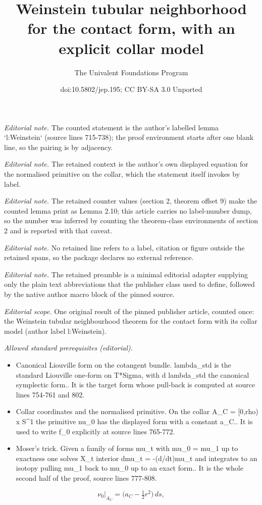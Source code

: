 \documentclass[10pt,a4paper]{article}
\title{Weinstein tubular neighborhood for the contact form, with an explicit collar model}
\author{The Univalent Foundations Program}
\date{doi:10.5802/jep.195; CC BY-SA 3.0 Unported}
\theoremstyle{definition}
\begin{document}
\maketitle
\setcounter{section}{2}
\setcounter{thm}{9}
\noindent\textit{Editorial note.} The counted statement is the author's labelled lemma `l:Weinstein` (source lines 715-738); the proof environment starts after one blank line, so the pairing is by adjacency.\par\medskip
\noindent\textit{Editorial note.} The retained context is the author's own displayed equation for the normalised primitive on the collar, which the statement itself invokes by label.\par\medskip
\noindent\textit{Editorial note.} The retained counter values (section 2, theorem offset 9) make the counted lemma print as Lemma 2.10; this article carries no label-number dump, so the number was inferred by counting the theorem-class environments of section 2 and is reported with that caveat.\par\medskip
\noindent\textit{Editorial note.} No retained line refers to a label, citation or figure outside the retained spans, so the package declares no external reference.\par\medskip
\noindent\textit{Editorial note.} The retained preamble is a minimal editorial adapter supplying only the plain text abbreviations that the publisher class used to define, followed by the native author macro block of the pinned source.\par\medskip
\noindent\textit{Editorial scope.} One original result of the pinned publisher article, counted once: the Weinstein tubular neighbourhood theorem for the contact form with its collar model (author label l:Weinstein).\par\medskip
\noindent\textit{Allowed standard prerequisites (editorial).}\begin{itemize}
\item Canonical Liouville form on the cotangent bundle. lambda\_std is the standard Liouville one-form on T*Sigma, with d lambda\_std the canonical symplectic form.. It is the target form whose pull-back is computed at source lines 754-761 and 802.
\item Collar coordinates and the normalised primitive. On the collar A\_C = [0,rho) x S\textasciicircum{}1 the primitive nu\_0 has the displayed form with a constant a\_C.. It is used to write f\_0 explicitly at source lines 765-772.
\item Moser's trick. Given a family of forms mu\_t with mu\_0 = mu\_1 up to exactness one solves X\_t interior dmu\_t = -(d/dt)mu\_t and integrates to an isotopy pulling mu\_1 back to mu\_0 up to an exact form.. It is the whole second half of the proof, source lines 777-808.
\end{itemize}\medskip
\begin{equation}
\label{e:lambda|_A}
\nu_0|_{A_C} = \bigl( a_C - \tfrac{1}{2} r^2 \bigr)\, ds,
\end{equation}
\end{document}

